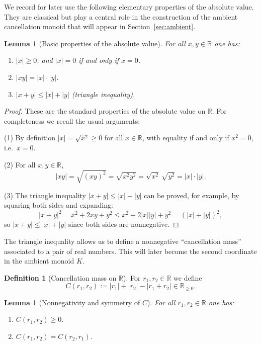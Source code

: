 \documentclass[11pt]{amsart}
\numberwithin{equation}{section}
\newtheorem{lemma}[theorem]{Lemma}
\theoremstyle{definition}
\newtheorem{definition}[theorem]{Definition}
\theoremstyle{remark}
\newcommand{\R}{\mathbb{R}}
\newcommand{\Kamb}{K}                      %
\newcommand{\Cfun}{C}                      %
\begin{document}
We record for later use the following elementary properties of the
absolute value.  They are classical but play a central role in the
construction of the ambient cancellation monoid that will appear in
Section~\ref{sec:ambient}.

\begin{lemma}[Basic properties of the absolute value]\label{lem:basic-abs}
For all $x,y\in\R$ one has:
\begin{enumerate}
  \item $|x|\ge0$, and $|x|=0$ if and only if $x=0$.
  \item $|xy| = |x|\cdot|y|$.
  \item $|x+y|\le|x|+|y|$ (triangle inequality).
\end{enumerate}
\end{lemma}

\begin{proof}
These are the standard properties of the absolute value on $\R$.  For
completeness we recall the usual arguments:

(1) By definition $|x|=\sqrt{x^2}\ge0$ for all $x\in\R$, with equality
if and only if $x^2=0$, i.e.\ $x=0$.

(2) For all $x,y\in\R$,
\[
  |xy| = \sqrt{(xy)^2} = \sqrt{x^2y^2}
       = \sqrt{x^2}\,\sqrt{y^2}
       = |x|\cdot|y|.
\]

(3) The triangle inequality $|x+y|\le|x|+|y|$ can be proved, for
example, by squaring both sides and expanding:
\[
  |x+y|^2 = x^2+2xy+y^2
          \le x^2+2|x||y|+y^2
          = (|x|+|y|)^2,
\]
so $|x+y|\le|x|+|y|$ since both sides are nonnegative.
\end{proof}

The triangle inequality allows us to define a nonnegative ``cancellation
mass'' associated to a pair of real numbers.  This will later become
the second coordinate in the ambient monoid $\Kamb$.

\begin{definition}[Cancellation mass on $\R$]\label{def:basic-C}
For $r_1,r_2\in\R$ we define
\[
  \Cfun(r_1,r_2)
  := |r_1| + |r_2| - |r_1+r_2|\in\R_{\ge0}.
\]
\end{definition}

\begin{lemma}[Nonnegativity and symmetry of $\Cfun$]\label{lem:basic-C}
For all $r_1,r_2\in\R$ one has:
\begin{enumerate}
  \item $\Cfun(r_1,r_2)\ge0$.
  \item $\Cfun(r_1,r_2)=\Cfun(r_2,r_1)$.
\end{enumerate}
\end{lemma}
\end{document}
